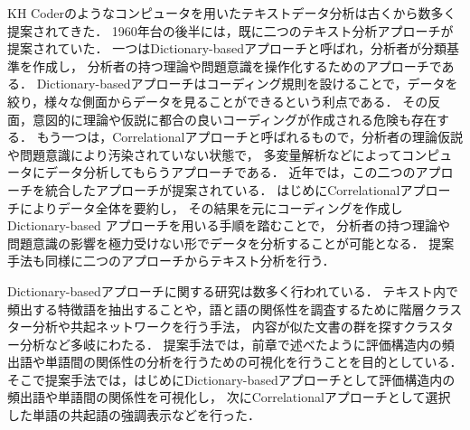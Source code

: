 \documentclass[syuuron]{kuee}
\begin{document}
		KH Coderのようなコンピュータを用いたテキストデータ分析は古くから数多く提案されてきた．
		1960年台の後半には，既に二つのテキスト分析アプローチが提案されていた．
		一つはDictionary-basedアプローチと呼ばれ，分析者が分類基準を作成し，
		分析者の持つ理論や問題意識を操作化するためのアプローチである\cite{kh3}．
		Dictionary-basedアプローチはコーディング規則を設けることで，データを絞り，様々な側面からデータを見ることができるという利点である．
		その反面，意図的に理論や仮説に都合の良いコーディングが作成される危険も存在する．
		もう一つは，Correlationalアプローチと呼ばれるもので，分析者の理論仮説や問題意識により汚染されていない状態で，
		多変量解析などによってコンピュータにデータ分析してもらうアプローチである．
		近年では，この二つのアプローチを統合したアプローチが提案されている\cite{kh1}\cite{kh2}．
		はじめにCorrelationalアプローチによりデータ全体を要約し，
		その結果を元にコーディングを作成しDictionary-based アプローチを用いる手順を踏むことで，
		分析者の持つ理論や問題意識の影響を極力受けない形でデータを分析することが可能となる．
		提案手法も同様に二つのアプローチからテキスト分析を行う．
		
		Dictionary-basedアプローチに関する研究は数多く行われている．
		テキスト内で頻出する特徴語を抽出することや，語と語の関係性を調査するために階層クラスター分析や共起ネットワークを行う手法，
		内容が似た文書の群を探すクラスター分析など多岐にわたる．
		提案手法では，前章で述べたように評価構造内の頻出語や単語間の関係性の分析を行うための可視化を行うことを目的としている．
		そこで提案手法では，はじめにDictionary-basedアプローチとして評価構造内の頻出語や単語間の関係性を可視化し，
		次にCorrelationalアプローチとして選択した単語の共起語の強調表示などを行った．
		
\end{document}
